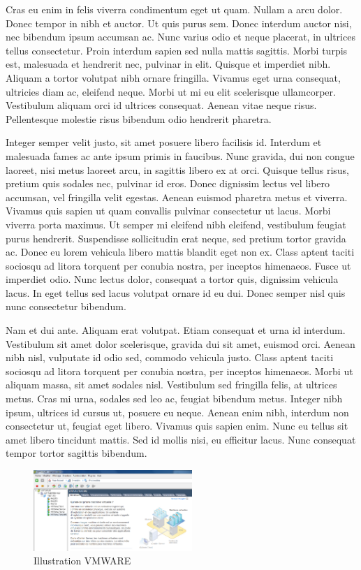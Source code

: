 \documentclass{report}
\begin{document}
Cras eu enim in felis viverra condimentum eget ut quam. Nullam a arcu dolor. Donec tempor in nibh et auctor. Ut quis purus sem. Donec interdum auctor nisi, nec bibendum ipsum accumsan ac. Nunc varius odio et neque placerat, in ultrices tellus consectetur. Proin interdum sapien sed nulla mattis sagittis. Morbi turpis est, malesuada et hendrerit nec, pulvinar in elit. Quisque et imperdiet nibh. Aliquam a tortor volutpat nibh ornare fringilla. Vivamus eget urna consequat, ultricies diam ac, eleifend neque. Morbi ut mi eu elit scelerisque ullamcorper. Vestibulum aliquam orci id ultrices consequat. Aenean vitae neque risus. Pellentesque molestie risus bibendum odio hendrerit pharetra.

Integer semper velit justo, sit amet posuere libero facilisis id. Interdum et malesuada fames ac ante ipsum primis in faucibus. Nunc gravida, dui non congue laoreet, nisi metus laoreet arcu, in sagittis libero ex at orci. Quisque tellus risus, pretium quis sodales nec, pulvinar id eros. Donec dignissim lectus vel libero accumsan, vel fringilla velit egestas. Aenean euismod pharetra metus et viverra. Vivamus quis sapien ut quam convallis pulvinar consectetur ut lacus. Morbi viverra porta maximus. Ut semper mi eleifend nibh eleifend, vestibulum feugiat purus hendrerit. Suspendisse sollicitudin erat neque, sed pretium tortor gravida ac. Donec eu lorem vehicula libero mattis blandit eget non ex. Class aptent taciti sociosqu ad litora torquent per conubia nostra, per inceptos himenaeos. Fusce ut imperdiet odio. Nunc lectus dolor, consequat a tortor quis, dignissim vehicula lacus. In eget tellus sed lacus volutpat ornare id eu dui. Donec semper nisl quis nunc consectetur bibendum.


Nam et dui ante. Aliquam erat volutpat. Etiam consequat et urna id interdum. Vestibulum sit amet dolor scelerisque, gravida dui sit amet, euismod orci. Aenean nibh nisl, vulputate id odio sed, commodo vehicula justo. Class aptent taciti sociosqu ad litora torquent per conubia nostra, per inceptos himenaeos. Morbi ut aliquam massa, sit amet sodales nisl. Vestibulum sed fringilla felis, at ultrices metus. Cras mi urna, sodales sed leo ac, feugiat bibendum metus. Integer nibh ipsum, ultrices id cursus ut, posuere eu neque. Aenean enim nibh, interdum non consectetur ut, feugiat eget libero. Vivamus quis sapien enim. Nunc eu tellus sit amet libero tincidunt mattis. Sed id mollis nisi, eu efficitur lacus. Nunc consequat tempor tortor sagittis bibendum.

\begin{figure}[!h]
\centering
\includegraphics[width=6cm]{./images/images/configVMWARE}
\caption{Illustration VMWARE}
\end{figure}
\end{document}
